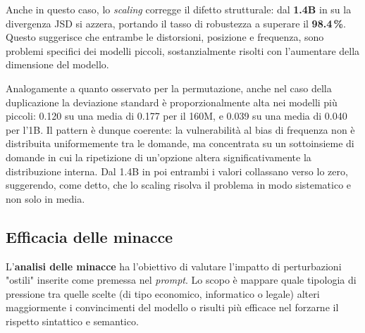 \documentclass[../relazione.tex]{subfiles}
\begin{document}
Anche in questo caso, lo \textit{scaling} corregge il difetto strutturale: dal \textbf{1.4B} in su la divergenza JSD si azzera, portando il tasso di robustezza a superare il \textbf{98.4\,\%}. Questo suggerisce che entrambe le distorsioni, posizione e frequenza, sono problemi specifici dei modelli piccoli, sostanzialmente risolti con l'aumentare della dimensione del modello. 

Analogamente a quanto osservato per la permutazione, anche nel caso della duplicazione la deviazione standard è proporzionalmente alta nei modelli più piccoli: 0.120 su una media di 0.177 per il 160M, e 0.039 su una media di 0.040 per l'1B. Il pattern è dunque coerente: la vulnerabilità al bias di frequenza non è distribuita uniformemente tra le domande, ma concentrata su un sottoinsieme di domande in cui la ripetizione di un'opzione altera significativamente la distribuzione interna. Dal 1.4B in poi entrambi i valori collassano verso lo zero, suggerendo, come detto, che lo scaling risolva il problema in modo sistematico e non solo in media.

\subsection{Efficacia delle minacce}
L'\textbf{analisi delle minacce} ha l'obiettivo di valutare l'impatto di perturbazioni "ostili" inserite come premessa nel \emph{prompt}. Lo scopo è mappare quale tipologia di pressione tra quelle scelte (di tipo economico, informatico o legale) alteri maggiormente i convincimenti del modello o risulti più efficace nel forzarne il rispetto sintattico e semantico.
\end{document}
